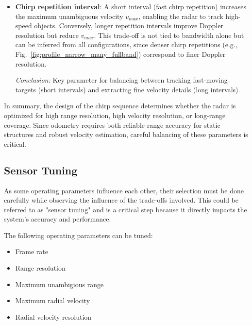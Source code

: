 \begin{itemize}
    \vspace{1em} 
    \item \textbf{Chirp repetition interval}:  
    A short interval (fast chirp repetition) increases the maximum unambiguous velocity $v_{max}$, enabling the radar to track high-speed objects.  
    Conversely, longer repetition intervals improve Doppler resolution but reduce $v_{max}$.  
    This trade-off is not tied to bandwidth alone but can be inferred from all configurations, since denser chirp repetitions (e.g., Fig.~\ref{fig:profile_narrow_many_fullband}) correspond to finer Doppler resolution.

    {\small
    \textit{Conclusion:}  
    Key parameter for balancing between tracking fast-moving targets (short intervals) and extracting fine velocity details (long intervals).
    }
    \vspace{1em} 
\end{itemize}



In summary, the design of the chirp sequence determines whether the radar is optimized for high range resolution, high velocity resolution, or long-range coverage.  
Since odometry requires both reliable range accuracy for static structures and robust velocity estimation, careful balancing of these parameters is critical.  

\subsection{Sensor Tuning}
As some operating parameters influence each other, their selection must be done carefully while observing the influence of the trade-offs involved.
This could be referred to as "sensor tuning" and is a critical step because it directly impacts the system's accuracy and performance.

The following operating parameters can be tuned:
\begin{itemize}
    \item Frame rate
    \item Range resolution
    \item Maximum unambigious range
    \item Maximum radial velocity
    \item Radial velocity resolution
\end{itemize}

